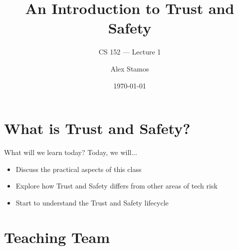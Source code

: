 \documentclass[nobackground,dvipsnames,table]{beamer}
\title{An Introduction to Trust and Safety}
\subtitle{CS 152 --- Lecture 1}
\author[A. Stamos]{Alex Stamos}
\institute[Stanford University]{Stanford Cyber Policy Center}
\date[2022]{\today}
\begin{document}
\begin{frame}
    \titlepage
\end{frame}

\section{What is Trust and Safety?}

\begin{frame}{What will we learn today?}
    Today, we will...
    \begin{itemize}
        \item Discuss the practical aspects of this class
        \item Explore how Trust and Safety differs from other areas of tech risk
        \item Start to understand the Trust and Safety lifecycle
    \end{itemize}
\end{frame}

\section{Teaching Team}
\end{document}
